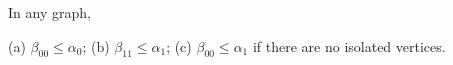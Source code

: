 In any graph,

(a) $\beta_{00} \leq \alpha_0$;
(b) $\beta_{11} \leq \alpha_1$;
(c) $\beta_{00} \leq \alpha_1$ if there are no isolated vertices.
